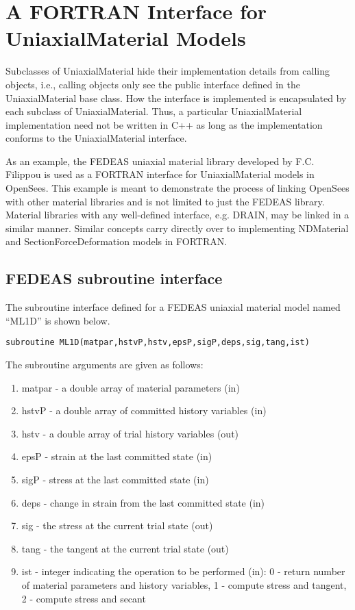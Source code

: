 \documentclass[12pt]{article}
\begin{document}
{\section{A FORTRAN Interface for UniaxialMaterial Models}
Subclasses of UniaxialMaterial hide their implementation details from calling
objects, i.e., calling objects only see the public interface defined in the UniaxialMaterial
base class. How the interface is implemented is encapsulated by each subclass
of UniaxialMaterial. Thus, a particular UniaxialMaterial implementation
need not be written in C++ as long as the implementation conforms to the UniaxialMaterial
interface.

As an example, the FEDEAS uniaxial material library developed by F.C. Filippou
is used as a FORTRAN interface for
UniaxialMaterial models in OpenSees. This example is meant to demonstrate the process
of linking OpenSees with other material libraries and is not limited to just the
FEDEAS library. Material libraries with any well-defined interface, e.g. DRAIN, may
be linked in a similar manner. Similar concepts carry directly over to
implementing NDMaterial and SectionForceDeformation models in FORTRAN.

\subsection{FEDEAS subroutine interface}
The subroutine interface defined for a FEDEAS uniaxial material model named ``ML1D''
is shown below.

{\sf\small
\begin{verbatim}
subroutine ML1D(matpar,hstvP,hstv,epsP,sigP,deps,sig,tang,ist)
\end{verbatim}
}

\noindent The subroutine arguments are given as follows:

\begin{enumerate}
\item{matpar} - a double array of material parameters (in)
\item{hstvP} - a double array of committed history variables (in)
\item{hstv} - a double array of trial history variables (out)
\item{epsP} - strain at the last committed state (in)
\item{sigP} - stress at the last committed state (in)
\item{deps} - change in strain from the last committed state (in)
\item{sig} - the stress at the current trial state (out)
\item{tang} - the tangent at the current trial state (out)
\item{ist} - integer indicating the operation to be performed (in): 0 - return number
of material parameters and history variables, 1 - compute stress and tangent, 2 - compute 
stress and secant
\end{enumerate}

}
\end{document}
